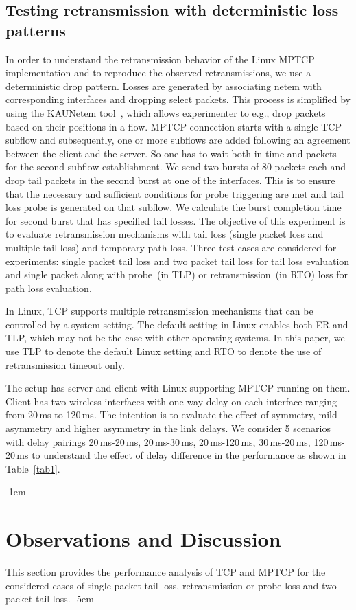 \documentclass[10pt,conference,compsoc]{IEEEtran}
\begin{document}
\subsection{Testing retransmission with deterministic loss patterns}
In order to understand the retransmission behavior of the Linux MPTCP implementation and to reproduce the observed retransmissions, we use a deterministic drop pattern.
Losses are generated by associating netem with corresponding interfaces and dropping select packets. This process is simplified by using the KAUNetem tool~\cite{Garcia2016}, which allows experimenter to e.g., drop packets based on their positions in a flow. MPTCP connection starts with a single TCP subflow and subsequently, one or more subflows are added following an agreement between the client and the server. So one has to wait both in time and packets for the second subflow establishment. We send two bursts of 80 packets each and drop tail packets in the second burst at one of the interfaces. This is to ensure that the necessary and sufficient conditions for probe triggering are met and tail loss probe is generated on that subflow. We calculate the burst completion time for second burst that has specified tail losses. The objective of this experiment is to evaluate retransmission mechanisms with tail loss (single packet loss and multiple tail loss) and temporary path loss. Three test cases are considered for experiments: single packet tail loss and two packet tail loss for tail loss evaluation and single packet along with probe~(in TLP) or retransmission~(in RTO) loss for path loss evaluation. 

In Linux, TCP supports multiple retransmission mechanisms that can be controlled by a system setting. The default setting in Linux enables both
ER and TLP, which may not be the case with other operating systems. In this paper, we use TLP to denote the default Linux setting and RTO to denote the use of retransmission timeout only.

The setup has server and client with Linux supporting MPTCP running on them. Client has two wireless interfaces with one way delay on each interface ranging from 20\,ms to 120\,ms. The intention is to evaluate the effect of symmetry, mild asymmetry and higher asymmetry in the link delays. We consider 5 scenarios with delay pairings 20\,ms-20\,ms, 20\,ms-30\,ms, 20\,ms-120\,ms, 30\,ms-20\,ms, 120\,ms-20\,ms to understand the effect of delay difference in the performance as shown in Table~\ref{tab1}.

\kern-1em
\section{Observations and Discussion}\label{disc}
This section provides the performance analysis of TCP and MPTCP for the considered cases of single packet tail loss, retransmission or probe loss and two packet 
tail loss.
\kern-5em
\end{document}
